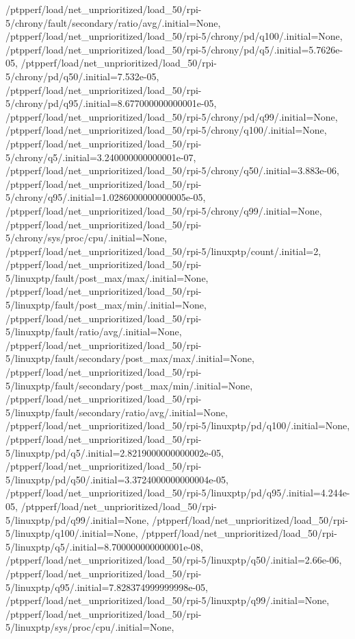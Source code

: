 {    /ptpperf/load/net_unprioritized/load_50/rpi-5/chrony/fault/secondary/ratio/avg/.initial=None,
    /ptpperf/load/net_unprioritized/load_50/rpi-5/chrony/pd/q100/.initial=None,
    /ptpperf/load/net_unprioritized/load_50/rpi-5/chrony/pd/q5/.initial=5.7626e-05,
    /ptpperf/load/net_unprioritized/load_50/rpi-5/chrony/pd/q50/.initial=7.532e-05,
    /ptpperf/load/net_unprioritized/load_50/rpi-5/chrony/pd/q95/.initial=8.677000000000001e-05,
    /ptpperf/load/net_unprioritized/load_50/rpi-5/chrony/pd/q99/.initial=None,
    /ptpperf/load/net_unprioritized/load_50/rpi-5/chrony/q100/.initial=None,
    /ptpperf/load/net_unprioritized/load_50/rpi-5/chrony/q5/.initial=3.240000000000001e-07,
    /ptpperf/load/net_unprioritized/load_50/rpi-5/chrony/q50/.initial=3.883e-06,
    /ptpperf/load/net_unprioritized/load_50/rpi-5/chrony/q95/.initial=1.0286000000000005e-05,
    /ptpperf/load/net_unprioritized/load_50/rpi-5/chrony/q99/.initial=None,
    /ptpperf/load/net_unprioritized/load_50/rpi-5/chrony/sys/proc/cpu/.initial=None,
    /ptpperf/load/net_unprioritized/load_50/rpi-5/linuxptp/count/.initial=2,
    /ptpperf/load/net_unprioritized/load_50/rpi-5/linuxptp/fault/post_max/max/.initial=None,
    /ptpperf/load/net_unprioritized/load_50/rpi-5/linuxptp/fault/post_max/min/.initial=None,
    /ptpperf/load/net_unprioritized/load_50/rpi-5/linuxptp/fault/ratio/avg/.initial=None,
    /ptpperf/load/net_unprioritized/load_50/rpi-5/linuxptp/fault/secondary/post_max/max/.initial=None,
    /ptpperf/load/net_unprioritized/load_50/rpi-5/linuxptp/fault/secondary/post_max/min/.initial=None,
    /ptpperf/load/net_unprioritized/load_50/rpi-5/linuxptp/fault/secondary/ratio/avg/.initial=None,
    /ptpperf/load/net_unprioritized/load_50/rpi-5/linuxptp/pd/q100/.initial=None,
    /ptpperf/load/net_unprioritized/load_50/rpi-5/linuxptp/pd/q5/.initial=2.8219000000000002e-05,
    /ptpperf/load/net_unprioritized/load_50/rpi-5/linuxptp/pd/q50/.initial=3.3724000000000004e-05,
    /ptpperf/load/net_unprioritized/load_50/rpi-5/linuxptp/pd/q95/.initial=4.244e-05,
    /ptpperf/load/net_unprioritized/load_50/rpi-5/linuxptp/pd/q99/.initial=None,
    /ptpperf/load/net_unprioritized/load_50/rpi-5/linuxptp/q100/.initial=None,
    /ptpperf/load/net_unprioritized/load_50/rpi-5/linuxptp/q5/.initial=8.700000000000001e-08,
    /ptpperf/load/net_unprioritized/load_50/rpi-5/linuxptp/q50/.initial=2.66e-06,
    /ptpperf/load/net_unprioritized/load_50/rpi-5/linuxptp/q95/.initial=7.828374999999998e-05,
    /ptpperf/load/net_unprioritized/load_50/rpi-5/linuxptp/q99/.initial=None,
    /ptpperf/load/net_unprioritized/load_50/rpi-5/linuxptp/sys/proc/cpu/.initial=None,
}
